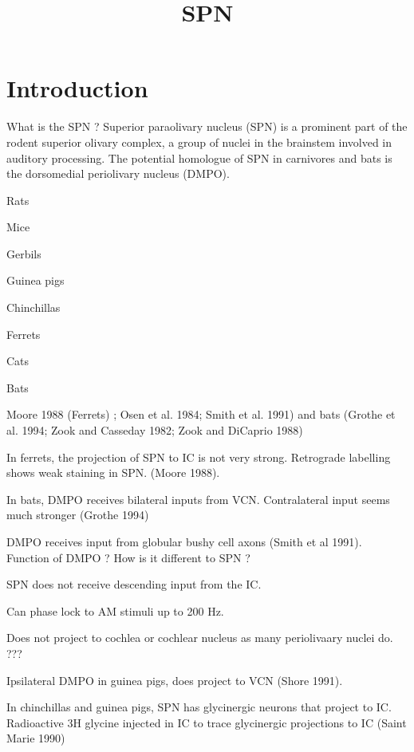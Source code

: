 \documentclass{article}
\begin{document}
\title{SPN}
\maketitle

\section{Introduction}

What is the SPN ?
Superior paraolivary nucleus (SPN) is  a prominent part of the rodent superior olivary complex, a group of nuclei in the brainstem involved in auditory processing. The potential homologue of SPN in carnivores and bats is the dorsomedial periolivary nucleus (DMPO).


Rats



Mice


Gerbils

Guinea pigs

Chinchillas


Ferrets

Cats

Bats


Moore 1988 (Ferrets) ; Osen et al. 1984; Smith et al. 1991) and bats (Grothe et al. 1994; Zook and Casseday 1982; Zook and DiCaprio 1988)

In ferrets, the projection of SPN to IC is not very strong. Retrograde labelling shows weak staining in SPN. (Moore 1988).

In bats, DMPO receives bilateral inputs from VCN. Contralateral input seems much stronger (Grothe 1994)

DMPO receives input from globular bushy cell axons (Smith et al 1991). Function of DMPO ? How is it different to SPN ?


SPN does not receive descending input from the IC.

Can phase lock to AM stimuli up to 200 Hz. 

Does not project to cochlea or cochlear nucleus as many periolivaary nuclei  do. ???

Ipsilateral DMPO in guinea pigs, does project to VCN (Shore 1991).





In chinchillas and guinea pigs, SPN has glycinergic neurons that project to IC. Radioactive 3H glycine injected in IC to trace glycinergic projections to IC (Saint Marie 1990)
\end{document}
